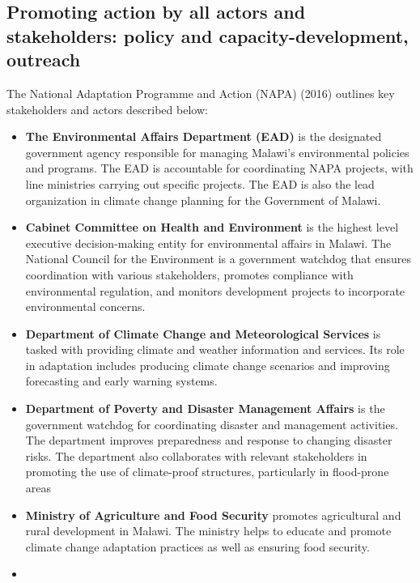 \documentclass[
]{book}
\begin{document}
\hypertarget{promoting-action-by-all-actors-and-stakeholders-policy-and-capacity-development-outreach}{%
\subsection{Promoting action by all actors and stakeholders: policy and capacity-development, outreach}\label{promoting-action-by-all-actors-and-stakeholders-policy-and-capacity-development-outreach}}

The National Adaptation Programme and Action (NAPA) (2016) outlines key stakeholders and actors described below:

\begin{itemize}
\item
  \textbf{The Environmental Affairs Department (EAD)} is the designated government agency responsible for managing Malawi's environmental policies and programs. The EAD is accountable for coordinating NAPA projects, with line ministries carrying out specific projects. The EAD is also the lead organization in climate change planning for the Government of Malawi.
\item
  \textbf{Cabinet Committee on Health and Environment} is the highest level executive decision-making entity for environmental affairs in Malawi. The National Council
  for the Environment is a government watchdog that ensures coordination with various stakeholders, promotes compliance with environmental regulation, and
  monitors development projects to incorporate environmental concerns.
\item
  \textbf{Department of Climate Change and Meteorological Services} is tasked with providing climate and weather information and services. Its role in adaptation includes producing climate change scenarios and improving forecasting and early warning systems.
\item
  \textbf{Department of Poverty and Disaster Management Affairs} is the government watchdog for coordinating disaster and management activities. The department
  improves preparedness and response to changing disaster risks. The department also collaborates with relevant stakeholders in promoting the use of climate-proof
  structures, particularly in flood-prone areas
\item
  \textbf{Ministry of Agriculture and Food Security} promotes agricultural and rural development in Malawi. The ministry helps to educate and promote climate change
  adaptation practices as well as ensuring food security.
\item

\end{itemize}
\end{document}

